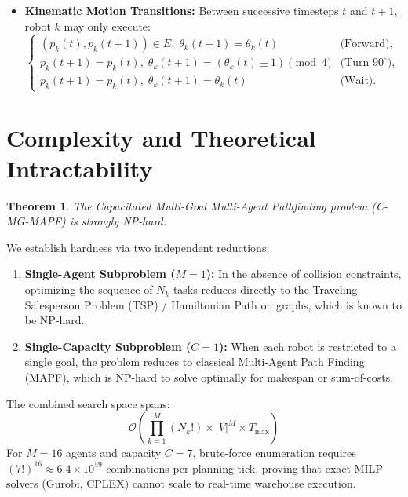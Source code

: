 \documentclass[journal]{IEEEtran}
\begin{document}
\begin{itemize}
    \item \textbf{Kinematic Motion Transitions:}
    Between successive timesteps $t$ and $t+1$, robot $k$ may only execute:
    \begin{equation}
    \begin{cases}
    (p_k(t), p_k(t+1)) \in E, \; \theta_k(t+1) = \theta_k(t) & \text{(Forward)}, \\
    p_k(t+1) = p_k(t), \; \theta_k(t+1) = (\theta_k(t) \pm 1) \pmod 4 & \text{(Turn } 90^\circ\text{)}, \\
    p_k(t+1) = p_k(t), \; \theta_k(t+1) = \theta_k(t) & \text{(Wait)}.
    \end{cases}
    \end{equation}
\end{itemize}

\section{Complexity and Theoretical Intractability}

\newtheorem{theorem}{Theorem}
\begin{theorem}
The Capacitated Multi-Goal Multi-Agent Pathfinding problem (C-MG-MAPF) is strongly NP-hard.
\end{theorem}

\begin{IEEEproof}
We establish hardness via two independent reductions:
\begin{enumerate}
    \item \textbf{Single-Agent Subproblem ($M = 1$):} In the absence of collision constraints, optimizing the sequence of $N_k$ tasks reduces directly to the Traveling Salesperson Problem (TSP) / Hamiltonian Path on graphs, which is known to be NP-hard.
    \item \textbf{Single-Capacity Subproblem ($C = 1$):} When each robot is restricted to a single goal, the problem reduces to classical Multi-Agent Path Finding (MAPF), which is NP-hard to solve optimally for makespan or sum-of-costs.
\end{enumerate}
The combined search space spans:
\begin{equation}
\mathcal{O}\left( \prod_{k=1}^M (N_k!) \times |V|^M \times T_{\max} \right)
\end{equation}
For $M = 16$ agents and capacity $C = 7$, brute-force enumeration requires $(7!)^{16} \approx 6.4 \times 10^{59}$ combinations per planning tick, proving that exact MILP solvers (Gurobi, CPLEX) cannot scale to real-time warehouse execution.
\end{IEEEproof}
\end{document}
